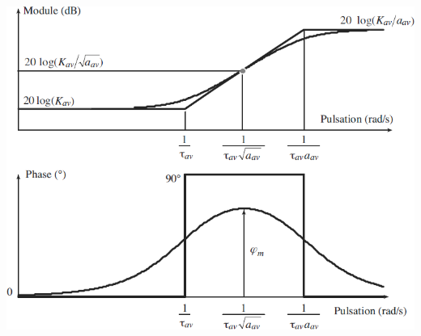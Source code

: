 \documentclass[10pt,fleqn]{article} %
\begin{document}
\begin{multicols}{2}
\begin{minipage}[c]{.58\linewidth}
\begin{center}
\includegraphics[width=.8\linewidth]{images/pt_15}
\end{center}

\end{minipage}


\end{multicols}
%
%
%
%
%


%
%
%
%
%
%
%
\end{document}
